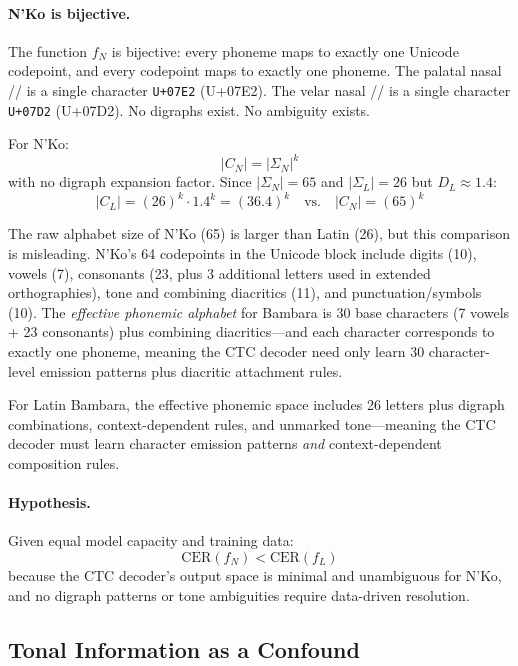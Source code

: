 \documentclass[11pt]{article}
\begin{document}
\paragraph{N'Ko is bijective.}
The function $f_N$ is bijective: every phoneme maps to exactly one Unicode codepoint, and every codepoint maps to exactly one phoneme.
The palatal nasal // is a single character \texttt{U+07E2} (U+07E2).
The velar nasal // is a single character \texttt{U+07D2} (U+07D2).
No digraphs exist.
No ambiguity exists.

For N'Ko:
\begin{equation}
|C_N| = |\Sigma_N|^k
\end{equation}
with no digraph expansion factor.
Since $|\Sigma_N| = 65$ and $|\Sigma_L| = 26$ but $D_L \approx 1.4$:
\begin{equation}
|C_L| = (26)^k \cdot 1.4^k = (36.4)^k \quad \text{vs.} \quad |C_N| = (65)^k
\end{equation}

The raw alphabet size of N'Ko (65) is larger than Latin (26), but this comparison is misleading.
N'Ko's 64 codepoints in the Unicode block include digits (10), vowels (7), consonants (23, plus 3 additional letters used in extended orthographies), tone and combining diacritics (11), and punctuation/symbols (10).
The \emph{effective phonemic alphabet} for Bambara is 30 base characters (7 vowels + 23 consonants) plus combining diacritics---and each character corresponds to exactly one phoneme, meaning the CTC decoder need only learn 30 character-level emission patterns plus diacritic attachment rules.

For Latin Bambara, the effective phonemic space includes 26 letters plus digraph combinations, context-dependent rules, and unmarked tone---meaning the CTC decoder must learn character emission patterns \emph{and} context-dependent composition rules.

\paragraph{Hypothesis.}
Given equal model capacity and training data:
\begin{equation}
\text{CER}(f_N) < \text{CER}(f_L)
\end{equation}
because the CTC decoder's output space is minimal and unambiguous for N'Ko, and no digraph patterns or tone ambiguities require data-driven resolution.

\subsection{Tonal Information as a Confound}
\end{document}
